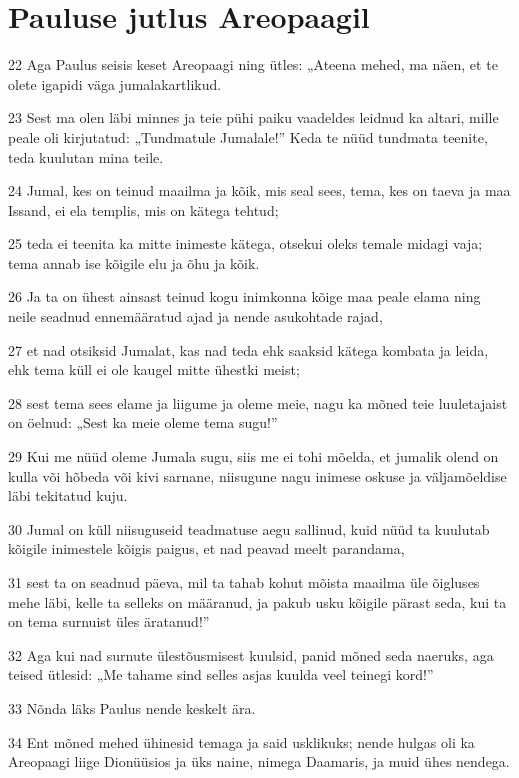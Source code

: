 \section*{Pauluse jutlus Areopaagil}

\par 22 Aga Paulus seisis keset Areopaagi ning ütles: „Ateena mehed, ma näen, et te olete igapidi väga jumalakartlikud.
\par 23 Sest ma olen läbi minnes ja teie pühi paiku vaadeldes leidnud ka altari, mille peale oli kirjutatud: „Tundmatule Jumalale!” Keda te nüüd tundmata teenite, teda kuulutan mina teile.
\par 24 Jumal, kes on teinud maailma ja kõik, mis seal sees, tema, kes on taeva ja maa Issand, ei ela templis, mis on kätega tehtud;
\par 25 teda ei teenita ka mitte inimeste kätega, otsekui oleks temale midagi vaja; tema annab ise kõigile elu ja õhu ja kõik.
\par 26 Ja ta on ühest ainsast teinud kogu inimkonna kõige maa peale elama ning neile seadnud ennemääratud ajad ja nende asukohtade rajad,
\par 27 et nad otsiksid Jumalat, kas nad teda ehk saaksid kätega kombata ja leida, ehk tema küll ei ole kaugel mitte ühestki meist;
\par 28 sest tema sees elame ja liigume ja oleme meie, nagu ka mõned teie luuletajaist on öelnud: „Sest ka meie oleme tema sugu!”
\par 29 Kui me nüüd oleme Jumala sugu, siis me ei tohi mõelda, et jumalik olend on kulla või hõbeda või kivi sarnane, niisugune nagu inimese oskuse ja väljamõeldise läbi tekitatud kuju.
\par 30 Jumal on küll niisuguseid teadmatuse aegu sallinud, kuid nüüd ta kuulutab kõigile inimestele kõigis paigus, et nad peavad meelt parandama,
\par 31 sest ta on seadnud päeva, mil ta tahab kohut mõista maailma üle õigluses mehe läbi, kelle ta selleks on määranud, ja pakub usku kõigile pärast seda, kui ta on tema surnuist üles äratanud!”
\par 32 Aga kui nad surnute ülestõusmisest kuulsid, panid mõned seda naeruks, aga teised ütlesid: „Me tahame sind selles asjas kuulda veel teinegi kord!”
\par 33 Nõnda läks Paulus nende keskelt ära.
\par 34 Ent mõned mehed ühinesid temaga ja said usklikuks; nende hulgas oli ka Areopaagi liige Dionüüsios ja üks naine, nimega Daamaris, ja muid ühes nendega.



